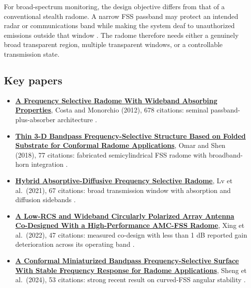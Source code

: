 \documentclass[
  10pt,
]{article}
\providecommand{\tightlist}{%
  \setlength{\itemsep}{0pt}\setlength{\parskip}{0pt}}
\begin{document}
For broad-spectrum monitoring, the design objective differs from that of
a conventional stealth radome. A narrow FSS passband may protect an
intended radar or communications band while making the system deaf to
unauthorized emissions outside that window
\citep{costa2012, tahseen2021}. The radome therefore needs either a
genuinely broad transparent region, multiple transparent windows, or a
controllable transmission state.

\subsection{Key papers}\label{key-papers-1}

\begin{itemize}
\tightlist
\item
  \href{https://consensus.app/papers/details/1811b78b36fa5cc0840c16f9dd6f2a1b/?utm_source=chatgpt}{\textbf{A
  Frequency Selective Radome With Wideband Absorbing Properties}}, Costa
  and Monorchio (2012), 678 citations: seminal passband-plus-absorber
  architecture \citep{costa2012}.
\item
  \href{https://consensus.app/papers/details/905ccf75368255a78a236f083a31e9ee/?utm_source=chatgpt}{\textbf{Thin
  3-D Bandpass Frequency-Selective Structure Based on Folded Substrate
  for Conformal Radome Applications}}, Omar and Shen (2018), 77
  citations: fabricated semicylindrical FSS radome with broadband-horn
  integration \citep{omar2018}.
\item
  \href{https://consensus.app/papers/details/62fa6b42c0305286b6a3a4c60ea60a46/?utm_source=chatgpt}{\textbf{Hybrid
  Absorptive-Diffusive Frequency Selective Radome}}, Lv et al.~(2021),
  67 citations: broad transmission window with absorption and diffusion
  sidebands \citep{lv2021}.
\item
  \href{https://consensus.app/papers/details/7a9db905b6b953c3a6f429fe051d4096/?utm_source=chatgpt}{\textbf{A
  Low-RCS and Wideband Circularly Polarized Array Antenna Co-Designed
  With a High-Performance AMC-FSS Radome}}, Xing et al.~(2022), 47
  citations: measured co-design with less than 1 dB reported gain
  deterioration across its operating band \citep{xing2022}.
\item
  \href{https://consensus.app/papers/details/6cb5b6043f755325b7abd988656c9afd/?utm_source=chatgpt}{\textbf{A
  Conformal Miniaturized Bandpass Frequency-Selective Surface With
  Stable Frequency Response for Radome Applications}}, Sheng et
  al.~(2024), 53 citations: strong recent result on curved-FSS angular
  stability \citep{sheng2024}.
\end{itemize}
\end{document}

